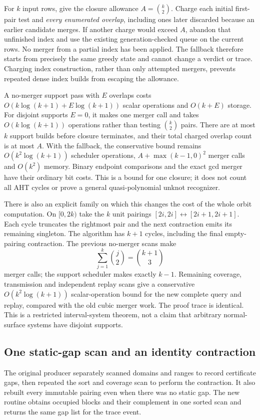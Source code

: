For $k$ input rows, give the closure allowance $A=\binom{k}{2}$. Charge
each initial first-pair test and \emph{every enumerated overlap}, including
ones later discarded because an earlier candidate merges. If another charge
would exceed $A$, abandon that unfinished index and use the existing
generation-checked queue on the current rows. No merger from a partial index
has been applied. The fallback therefore starts from precisely the same
greedy state and cannot change a verdict or trace. Charging index construction,
rather than only attempted mergers, prevents repeated dense index builds
from escaping the allowance.

A no-merger support pass with $E$ overlaps costs
$O(k\log(k+1)+E\log(k+1))$ scalar operations and $O(k+E)$ storage.
For disjoint supports $E=0$, it makes one merger call and takes
$O(k\log(k+1))$ operations rather than testing $\binom{k}{2}$ pairs.
There are at most $k$ support builds before closure terminates, and their
total charged overlap count is at most $A$. With the fallback, the
conservative bound remains $O(k^2\log(k+1))$ scheduler operations,
$A+\max(k-1,0)^2$ merger calls and $O(k^2)$ memory. Binary endpoint
comparisons and the exact gcd merger have their ordinary bit costs. This
is a bound for one closure; it does not count all AHT cycles or prove a
general quasi-polynomial unknot recognizer.

There is also an explicit family on which this changes the cost of the
whole orbit computation. On $[0,2k)$ take the $k$ unit pairings
$[2i,2i]\leftrightarrow[2i+1,2i+1]$. Each cycle truncates the rightmost
pair and the next contraction emits its remaining singleton. The algorithm
has $k+1$ cycles, including the final empty-pairing contraction. The previous
no-merger scans make
\[
 \sum_{j=1}^k\binom{j}{2}=\binom{k+1}{3}
\]
merger calls; the support scheduler makes exactly $k-1$. Remaining coverage,
transmission and independent replay scans give a conservative
$O(k^2\log(k+1))$ scalar-operation bound for the new complete query and
replay, compared with the old cubic merger work. The proof trace is identical.
This is a restricted interval-system theorem, not a claim that arbitrary
normal-surface systems have disjoint supports.

\subsection{One static-gap scan and an identity contraction}

The original producer separately scanned domains and ranges to record
certificate gaps, then repeated the sort and coverage scan to perform the
contraction. It also rebuilt every immutable pairing even when there was
no static gap. The new routine obtains occupied blocks and their complement
in one sorted scan and returns the same gap list for the trace event.

